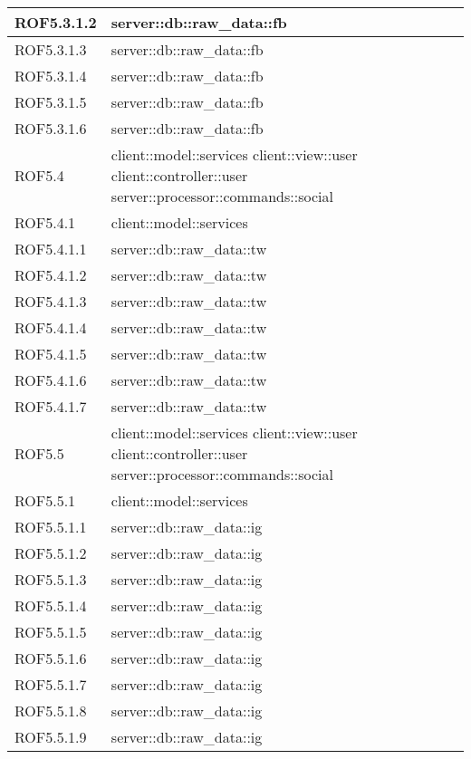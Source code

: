 \begin{center}
\begin{longtable}{| p{4cm} | p{8cm} |}
ROF5.3.1.2 & server::db::raw\_data::fb \\
\hline
ROF5.3.1.3 & server::db::raw\_data::fb \\
\hline
ROF5.3.1.4 & server::db::raw\_data::fb \\
\hline
ROF5.3.1.5 & server::db::raw\_data::fb \\
\hline
ROF5.3.1.6 & server::db::raw\_data::fb \\
\hline
ROF5.4 & client::model::services \newline client::view::user \newline client::controller::user \newline server::processor::commands::social \\
\hline
ROF5.4.1 & client::model::services \\
\hline
ROF5.4.1.1 & server::db::raw\_data::tw \\
\hline
ROF5.4.1.2 & server::db::raw\_data::tw \\
\hline
ROF5.4.1.3 & server::db::raw\_data::tw \\
\hline
ROF5.4.1.4 & server::db::raw\_data::tw \\
\hline
ROF5.4.1.5 & server::db::raw\_data::tw \\
\hline
ROF5.4.1.6 & server::db::raw\_data::tw \\
\hline
ROF5.4.1.7 & server::db::raw\_data::tw \\
\hline
ROF5.5 & client::model::services \newline client::view::user \newline client::controller::user \newline server::processor::commands::social \\
\hline
ROF5.5.1 & client::model::services \\
\hline
ROF5.5.1.1 & server::db::raw\_data::ig \\
\hline
ROF5.5.1.2 & server::db::raw\_data::ig \\
\hline
ROF5.5.1.3 & server::db::raw\_data::ig \\
\hline
ROF5.5.1.4 & server::db::raw\_data::ig \\
\hline
ROF5.5.1.5 & server::db::raw\_data::ig \\
\hline
ROF5.5.1.6 & server::db::raw\_data::ig \\
\hline
ROF5.5.1.7 & server::db::raw\_data::ig \\
\hline
ROF5.5.1.8 & server::db::raw\_data::ig \\
\hline
ROF5.5.1.9 & server::db::raw\_data::ig \\

\end{longtable}
\end{center}
